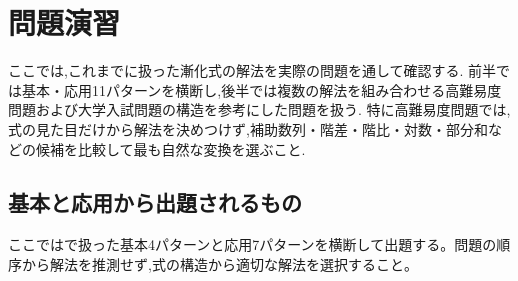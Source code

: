 
\chapter{問題演習}\label{節：実践演習}

  ここでは,これまでに扱った漸化式の解法を実際の問題を通して確認する.
  前半では基本・応用11パターンを横断し,後半では複数の解法を組み合わせる高難易度問題および大学入試問題の構造を参考にした問題を扱う.
  特に高難易度問題では,式の見た目だけから解法を決めつけず,補助数列・階差・階比・対数・部分和などの候補を比較して最も自然な変換を選ぶこと.


  \section{基本と応用から出題されるもの}\label{節：基本と応用から出題されるもの}
    ここではで扱った基本4パターンと応用7パターンを横断して出題する。問題の順序から解法を推測せず,式の構造から適切な解法を選択すること。

